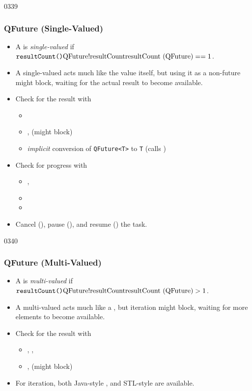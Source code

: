 \begin{slide}{0339}
\frametitle{QFuture (Single-Valued)}
  \begin{itemize}
  \item A  is \emph{single-valued} if 
    $\hbox{\hClsFn{QFuture}{resultCount}}==1$. %
  \item A single-valued  acts much like the value
    itself, but using it as a non-future might block, waiting for the
    actual result to become available.
  \item Check for the result with
    \begin{itemize}
    \item {}
    \item {},  (might block)
    \item \emph{implicit} conversion of \texttt{QFuture<T>} to
      \texttt{T} (calls )
    \end{itemize}
  \item Check for progress with
    \begin{itemize}
    \item {}, 
    \item {}
    \item {}
    \end{itemize}
  \item Cancel (), pause
    (), and resume ()
    the task.
  \end{itemize}
\end{slide}
\begin{slide}{0340}
\frametitle{QFuture (Multi-Valued)}
  \begin{itemize}
  \item A  is \emph{multi-valued} if 
    $\hbox{\hClsFn{QFuture}{resultCount}}>1$.
  \item A multi-valued  acts much like a
    , but iteration might block, waiting for more elements
    to become available.
  \item Check for the result with
    \begin{itemize}
    \item {}, ,
    \item {},  (might block)
    \end{itemize}
  \item For iteration, both Java-style , and
    STL-style  are available.    
\end{itemize}
\end{slide}
